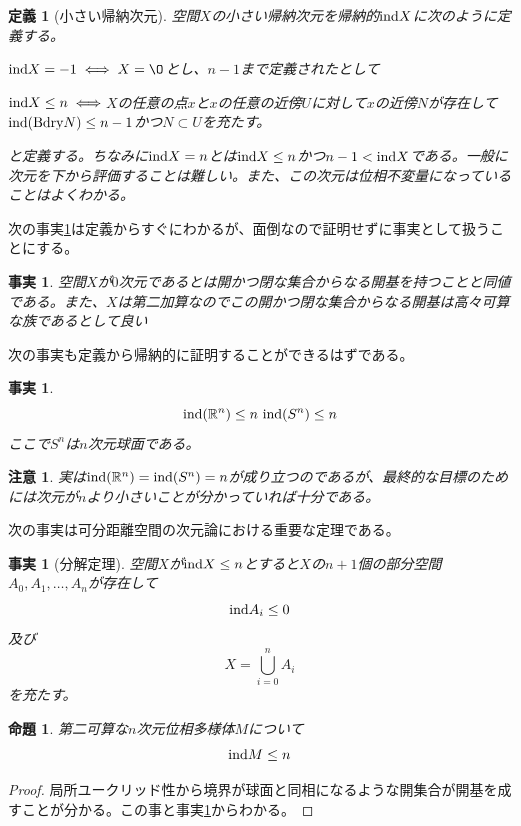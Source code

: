 \documentclass[leqno]{jsarticle}
\newtheorem{prop}[thm]{命題}
\newtheorem{df}[thm]{定義}
\newtheorem{fact}[thm]{事実}
\newtheorem*{cau}{注意}
\newcommand{\rr}{\mathbb{R}}
\newcommand{\bd}{\text{{\rm Bdry}}}
\newcommand{\ind}{\text{{\rm ind}}}
\begin{document}
\begin{df}[小さい帰納次元]
空間$X$の小さい帰納次元を帰納的$\ind X$に次のように定義する。\par
$\ind X=-1\iff X=\O$とし、$n-1$まで定義されたとして\par
$\ind X\le n\iff$$X$の任意の点$x$と$x$の任意の近傍$U$に対して$x$の近傍$N$が存在して$\ind (\bd N)\le n-1$かつ$N\subset U$を充たす。\par
と定義する。ちなみに$\ind X=n$とは$\ind X\le n$かつ$n-1<\ind X$である。一般に次元を下から評価することは難しい。また、この次元は位相不変量になっていることはよくわかる。
\end{df}
次の事実\ref{00}は定義からすぐにわかるが、面倒なので証明せずに事実として扱うことにする。
\begin{fact}\label{00}
空間$X$が$0$次元であるとは開かつ閉な集合からなる開基を持つことと同値である。また、$X$は第二加算なのでこの開かつ閉な集合からなる開基は高々可算な族であるとして良い
\end{fact}
次の事実も定義から帰納的に証明することができるはずである。
\begin{fact}\label{fact}
\[
\ind(\rr^n)\le n\ \ind (S^n)\le n
\]
ここで$S^n$は$n$次元球面である。
\end{fact}
\begin{cau}
実は$\ind(\rr^n)=\ind (S^n)=n$が成り立つのであるが、最終的な目標のためには次元が$n$より小さいことが分かっていれば十分である。
\end{cau}
次の事実は可分距離空間の次元論における重要な定理である。
\begin{fact}[分解定理]\label{qq}
空間$X$が$\ind X\le n$とすると$X$の$n+1$個の部分空間$A_0,A_1,\dots ,A_n$が存在して
\[
\ind A_i\le 0
\]
及び
\[
X=\bigcup_{i=0}^nA_i
\]
を充たす。
\end{fact}

\begin{prop}
第二可算な$n$次元位相多様体$M$について
\[
\ind M\le n
\]
\end{prop}
\begin{proof}
局所ユークリッド性から境界が球面と同相になるような開集合が開基を成すことが分かる。この事と事実\ref{fact}からわかる。
\end{proof}
\end{document}
